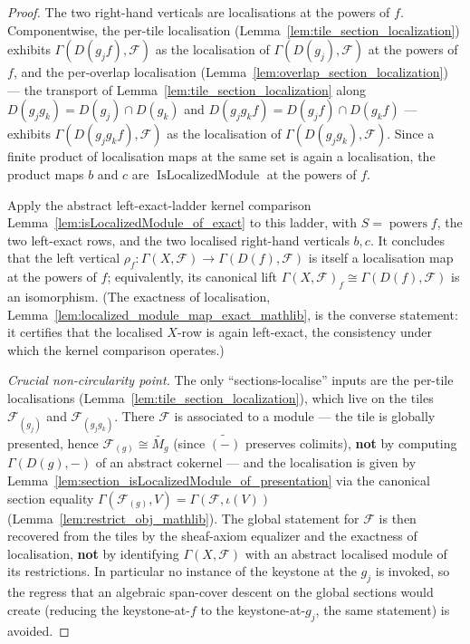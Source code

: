 \begin{proof}
  The two right-hand verticals are localisations at the powers of \(f\). Componentwise, the per-tile
  localisation (Lemma~\ref{lem:tile_section_localization}) exhibits \(\Gamma(D(g_j f), \mathcal{F})\) as
  the localisation of \(\Gamma(D(g_j), \mathcal{F})\) at the powers of \(f\), and the per-overlap
  localisation (Lemma~\ref{lem:overlap_section_localization}) — the transport of
  Lemma~\ref{lem:tile_section_localization} along \(D(g_j g_k) = D(g_j) \cap D(g_k)\) and
  \(D(g_j g_k f) = D(g_j f) \cap D(g_k f)\) — exhibits \(\Gamma(D(g_j g_k f), \mathcal{F})\) as the
  localisation of \(\Gamma(D(g_j g_k), \mathcal{F})\). Since a finite product of localisation maps at the
  same set is again a localisation, the product maps \(b\) and \(c\) are
  \(\operatorname{IsLocalizedModule}\) at the powers of \(f\).

  Apply the abstract left-exact-ladder kernel comparison
  Lemma~\ref{lem:isLocalizedModule_of_exact} to this ladder, with \(S = \operatorname{powers} f\), the
  two left-exact rows, and the two localised right-hand verticals \(b, c\). It concludes that the left
  vertical \(\rho_f : \Gamma(X, \mathcal{F}) \to \Gamma(D(f), \mathcal{F})\) is itself a localisation map
  at the powers of \(f\); equivalently, its canonical lift \(\Gamma(X, \mathcal{F})_f \cong
  \Gamma(D(f), \mathcal{F})\) is an isomorphism. (The exactness of localisation,
  Lemma~\ref{lem:localized_module_map_exact_mathlib}, is the converse statement: it certifies that the
  localised \(X\)-row is again left-exact, the consistency under which the kernel comparison operates.)

  \emph{Crucial non-circularity point.} The only ``sections-localise'' inputs are the per-tile
  localisations (Lemma~\ref{lem:tile_section_localization}), which live on the tiles
  \(\mathcal{F}_{(g_j)}\) and \(\mathcal{F}_{(g_j g_k)}\). There \(\mathcal{F}\) is associated to a
  module — the tile is globally presented, hence \(\mathcal{F}_{(g)} \cong \widetilde{M_g}\) (since
  \(\widetilde{(-)}\) preserves colimits), \textbf{not} by computing \(\Gamma(D(g), -)\) of an abstract
  cokernel — and the localisation is given by
  Lemma~\ref{lem:section_isLocalizedModule_of_presentation} via the canonical section
  equality \(\Gamma(\mathcal{F}_{(g)}, V) = \Gamma(\mathcal{F}, \iota(V))\)
  (Lemma~\ref{lem:restrict_obj_mathlib}). The global statement for \(\mathcal{F}\) is then recovered
  from the tiles by the sheaf-axiom equalizer and the exactness of localisation, \textbf{not} by
  identifying \(\Gamma(X, \mathcal{F})\) with an abstract localised module of its restrictions. In
  particular no instance of the keystone at the \(g_j\) is invoked, so the regress that an algebraic
  span-cover descent on the global sections would create (reducing the keystone-at-\(f\) to the
  keystone-at-\(g_j\), the same statement) is avoided.
\end{proof}


